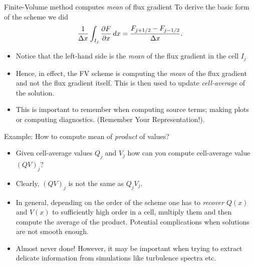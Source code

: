 \documentclass[aspectratio=169]{beamer}
\newcommand{\mypause}{}
\newcommand{\pfrac}[2]{\frac{\partial #1}{\partial #2}}
\begin{document}
\begin{frame}{Finite-Volume method computes \emph{mean} of flux gradient}
  To derive the basic form of the scheme we did
  \begin{align*}
    \frac{1}{\Delta x}\int_{I_j} \pfrac{F}{x} \thinspace dx =
    \frac{F_{j+1/2}-F_{j-1/2}}{\Delta x}.
  \end{align*}
  \begin{itemize}
  \item Notice that the left-hand side is the \emph{mean} of the flux
    gradient in the cell $I_j$
  \item Hence, in effect, the FV scheme is computing the \emph{mean}
    of the flux gradient and not the flux gradient itself. This is
    then used to update \emph{cell-average} of the solution.
  \item This is important to remember when computing source terms;
    making plots or computing diagnostics. (Remember Your
    Representation!).
  \end{itemize}
  
\end{frame}

\begin{frame}{Example: How to compute mean of \emph{product} of
    values?}
  \begin{itemize}
  \item Given cell-average values $Q_j$ and $V_j$ how can you compute
    cell-average value $(QV)_j$?%
    \mypause%
  \item Clearly, $(Q V)_j$ is not the same as $Q_j V_j$.%
    \mypause%
  \item In general, depending on the order of the scheme one has to
    \emph{recover} $Q(x)$ and $V(x)$ to sufficiently high order in a
    cell, multiply them and then compute the average of the
    product. Potential complications when solutions are not smooth
    enough.
  \item Almost never done! However, it may be important when trying to
    extract delicate information from simulations like turbulence
    spectra etc.
  \end{itemize}
\end{frame}
\end{document}
